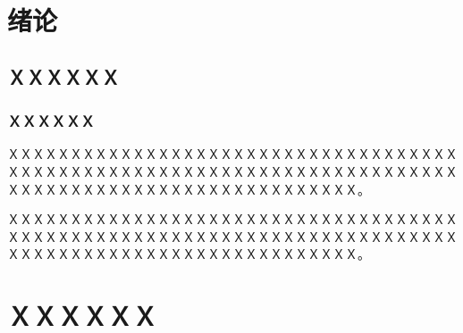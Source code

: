 \documentclass[a4paper]{ltxdoc}
\begin{document}
{
\thispagestyle{empty} %
\setcounter{page}{0}
\tableofcontents
}

\fancyhead{}
\pagestyle{fancy}

{
\pretocmd{\section}{\clearpage \vspace*{-2.0em}}{}{}

\setlength{\parindent}{2em}
\setlength{\parskip}{0.5em}
\setlength{\baselineskip}{22pt}

\section{绪论}
\subsection{ＸＸＸＸＸＸ}
\subsubsection{ＸＸＸＸＸＸ}
ＸＸＸＸＸＸＸＸＸＸＸＸＸＸＸＸＸＸＸＸＸＸＸＸＸＸＸＸＸＸＸＸＸＸＸＸＸＸＸＸＸＸＸＸＸＸＸＸＸＸＸＸＸＸＸＸＸＸＸＸＸＸＸＸＸＸＸＸＸＸＸＸＸＸＸＸＸＸＸＸＸＸＸＸＸＸＸＸＸＸＸＸＸＸＸＸＸＸＸＸ。

ＸＸＸＸＸＸＸＸＸＸＸＸＸＸＸＸＸＸＸＸＸＸＸＸＸＸＸＸＸＸＸＸＸＸＸＸＸＸＸＸＸＸＸＸＸＸＸＸＸＸＸＸＸＸＸＸＸＸＸＸＸＸＸＸＸＸＸＸＸＸＸＸＸＸＸＸＸＸＸＸＸＸＸＸＸＸＸＸＸＸＸＸＸＸＸＸＸＸＸＸ。

\section{ＸＸＸＸＸＸ}

}

{
\clearpage %
\nocite{*} %
}
\end{document}
